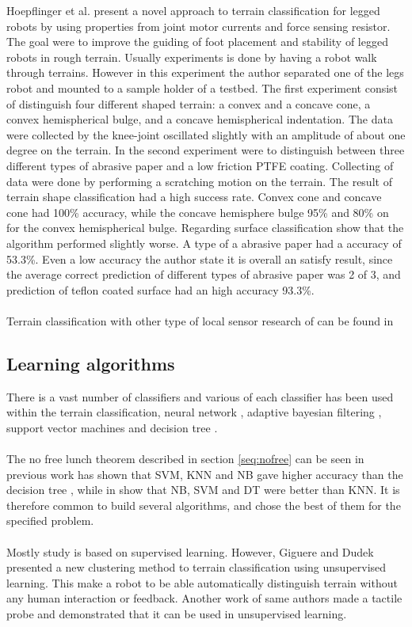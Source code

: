 \documentclass[USenglish]{ifimaster}  %
\begin{document}
Hoepflinger et al. \cite{5509309} present a novel approach to terrain classification for legged robots by using properties from joint motor currents and force sensing resistor. The goal were to improve the guiding of foot placement and stability of legged robots in rough terrain. Usually experiments is done by having a robot walk through terrains. However in this experiment the author separated one of the legs robot and mounted to a sample holder of a testbed. The first experiment consist of distinguish four different shaped terrain: a convex and a concave cone, a convex hemispherical bulge, and a concave hemispherical indentation. The data were collected by the knee-joint oscillated slightly with an amplitude of about one degree on the terrain. In the second experiment were to distinguish between three different types of abrasive paper and a low friction PTFE coating. Collecting of data were done by performing a scratching motion on the terrain. The result of terrain shape classification had a high success rate. Convex cone and concave cone had 100\% accuracy, while the concave hemisphere bulge 95\% and 80\% on for the convex hemispherical bulge. Regarding surface classification show that the algorithm performed slightly worse. A type of a abrasive paper had a accuracy of 53.3\%. Even a low accuracy the author state it is overall an satisfy result, since the average correct prediction of different types of abrasive paper was 2 of 3, and prediction of teflon coated surface had an high accuracy 93.3\%.
\\
\\
Terrain classification with other type of local sensor research of can be found in \cite{Giguere2009,6386243,6569179,6569179,4399500}

\subsection{Learning algorithms}
There is a vast number of classifiers and various of each classifier has been used within the terrain classification, neural network \cite{6784609,5752869,4654717}, adaptive bayesian filtering \cite{5152327,6849778}, support vector machines \cite{5602459,4161556,4059113} and decision tree \cite{6849778}.
\\
\\
The no free lunch theorem described in section \ref{seq:nofree} can be seen in previous work has shown that SVM, KNN and NB gave higher accuracy than the decision tree \cite{DBLP:conf/emcr/WeissFSZ07}, while in \cite{6849778} show that NB, SVM and DT were better than KNN. It is therefore common to build several algorithms, and chose the best of them for the specified problem. 
\\
\\
Mostly study is based on supervised learning. However, Giguere and Dudek \cite{Giguere2009} presented a new clustering method to terrain classification using unsupervised learning. This make a robot to be able automatically distinguish terrain without any human interaction or feedback. Another work of same authors
\cite{5752869} made a tactile probe and demonstrated that it can be used in unsupervised learning.
 
\end{document}

